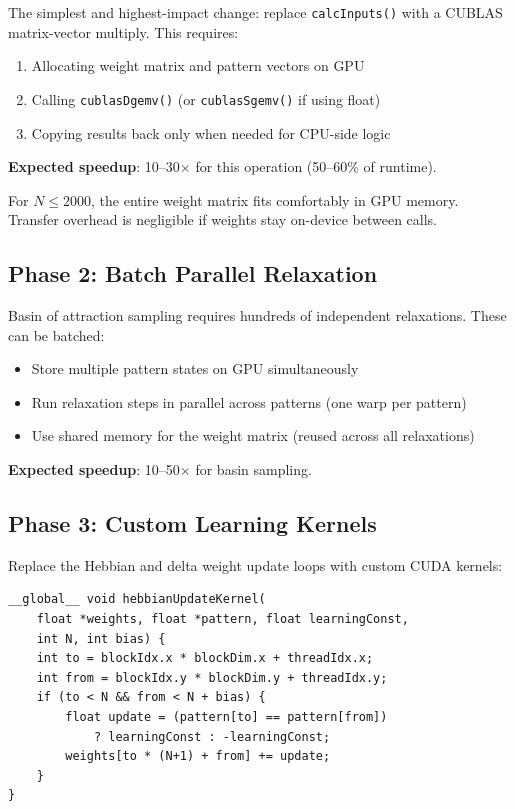 \documentclass[11pt,a4paper]{article}
\begin{document}
The simplest and highest-impact change: replace \texttt{calcInputs()} with a CUBLAS matrix-vector multiply. This requires:
\begin{enumerate}
    \item Allocating weight matrix and pattern vectors on GPU
    \item Calling \texttt{cublasDgemv()} (or \texttt{cublasSgemv()} if using float)
    \item Copying results back only when needed for CPU-side logic
\end{enumerate}

\textbf{Expected speedup}: 10--30$\times$ for this operation (50--60\% of runtime).

For $N \leq 2000$, the entire weight matrix fits comfortably in GPU memory. Transfer overhead is negligible if weights stay on-device between calls.

\subsection{Phase 2: Batch Parallel Relaxation}

Basin of attraction sampling requires hundreds of independent relaxations. These can be batched:
\begin{itemize}
    \item Store multiple pattern states on GPU simultaneously
    \item Run relaxation steps in parallel across patterns (one warp per pattern)
    \item Use shared memory for the weight matrix (reused across all relaxations)
\end{itemize}

\textbf{Expected speedup}: 10--50$\times$ for basin sampling.

\subsection{Phase 3: Custom Learning Kernels}

Replace the Hebbian and delta weight update loops with custom CUDA kernels:
\begin{lstlisting}
__global__ void hebbianUpdateKernel(
    float *weights, float *pattern, float learningConst,
    int N, int bias) {
    int to = blockIdx.x * blockDim.x + threadIdx.x;
    int from = blockIdx.y * blockDim.y + threadIdx.y;
    if (to < N && from < N + bias) {
        float update = (pattern[to] == pattern[from])
            ? learningConst : -learningConst;
        weights[to * (N+1) + from] += update;
    }
}
\end{lstlisting}
\end{document}
